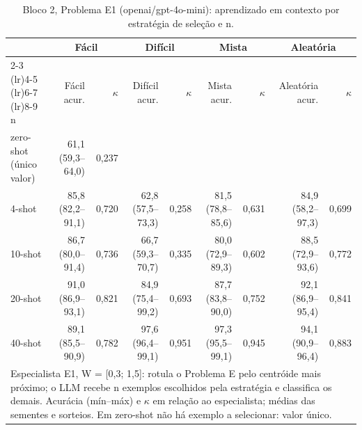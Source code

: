 \begin{table}[htbp]
\centering
\small
\caption{Bloco 2, Problema E1 (openai/gpt-4o-mini): aprendizado em contexto por estratégia de seleção e n.}
\label{tab:bloco2_E1_faseE_estrategia_x_nshot_gpt4mini}
\begin{tabular}{lrrrrrrrr}
\toprule
 & \multicolumn{2}{c}{Fácil} & \multicolumn{2}{c}{Difícil} & \multicolumn{2}{c}{Mista} & \multicolumn{2}{c}{Aleatória} \\ \cmidrule(lr){2-3} \cmidrule(lr){4-5} \cmidrule(lr){6-7} \cmidrule(lr){8-9}
n & Fácil acur. & $\kappa$ & Difícil acur. & $\kappa$ & Mista acur. & $\kappa$ & Aleatória acur. & $\kappa$ \\
\midrule
zero-shot (único valor) & 61,1 (59,3–64,0) & 0,237 &  &  &  &  &  &  \\
4-shot & 85,8 (82,2–91,1) & 0,720 & 62,8 (57,5–73,3) & 0,258 & 81,5 (78,8–85,6) & 0,631 & 84,9 (58,2–97,3) & 0,699 \\
10-shot & 86,7 (80,0–91,4) & 0,736 & 66,7 (59,3–70,7) & 0,335 & 80,0 (72,9–89,3) & 0,602 & 88,5 (72,9–93,6) & 0,772 \\
20-shot & 91,0 (86,9–93,1) & 0,821 & 84,9 (75,4–99,2) & 0,693 & 87,7 (83,8–90,0) & 0,752 & 92,1 (86,9–95,4) & 0,841 \\
40-shot & 89,1 (85,5–90,9) & 0,782 & 97,6 (96,4–99,1) & 0,951 & 97,3 (95,5–99,1) & 0,945 & 94,1 (90,9–96,4) & 0,883 \\
\bottomrule
\multicolumn{9}{p{0.95\linewidth}}{\footnotesize Especialista E1, W = [0,3; 1,5]: rotula o Problema E pelo centróide mais próximo; o LLM recebe n exemplos escolhidos pela estratégia e classifica os demais. Acurácia (mín–máx) e $\kappa$ em relação ao especialista; médias das sementes e sorteios. Em zero-shot não há exemplo a selecionar: valor único.} \\
\end{tabular}
\end{table}
